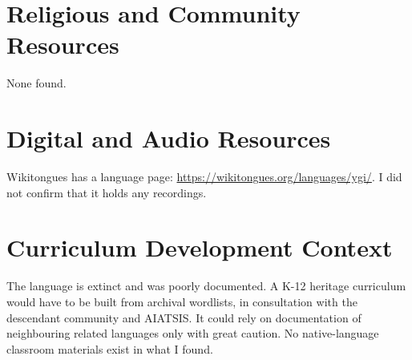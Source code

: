 \documentclass[12pt]{article}
\begin{document}
\section{Religious and Community Resources}
None found.

\section{Digital and Audio Resources}
Wikitongues has a language page: \url{https://wikitongues.org/languages/ygi/}. I did not confirm that it holds any recordings.

\section{Curriculum Development Context}
The language is extinct and was poorly documented. A K-12 heritage curriculum would have to be built from archival wordlists, in consultation with the descendant community and AIATSIS. It could rely on documentation of neighbouring related languages only with great caution. No native-language classroom materials exist in what I found.
\end{document}
